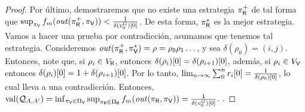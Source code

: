 \begin{proof}
Por último, demostraremos que no existe una estrategia $\pi^+_\Refuter$  de tal forma que $\sup_{\pi_\Verifier} \FMask(\out(\pi^+_\Refuter, \pi_\Verifier)) < \frac{1}{\pr{0}{\delta(v^G_0)}}$. 
De esta forma, $\pi^*_\Refuter$ es la mejor estrategia. 
Vamos a hacer una prueba por contradicción, asumamos que tenemos tal estrategia. Consideremos $\out(\pi^+_\Refuter, \pi^*_\Verifier) = \rho = \rho_0 \rho_1 \dots$, 
y sea $\delta(\rho_0) = (i,j)$. Entonces, note que, si $\rho_i \in V_\Refuter$, entonces $\pr{0}{\delta(\rho_i)} = \pr{0}{\delta(\rho_{i+1})}$, 
además, si $\rho_i \in V_\Verifier$ entonces $\pr{0}{\delta(\rho_i)} = 1 + \pr{0}{\delta(\rho_{i+1})}$. 
Por lo tanto, $\lim_{n \rightarrow \infty}\sum^n_{0} \pr{0}{r_i} = \frac{1}{\pr{0}{\delta(\rho_0)}}$, lo cual lleva a una contradicción.
Entonces, $\val(\QMStrGame) = \inf_{\pi_\Verifier \in \Pi_\Verifier} \sup_{\pi_\Refuter \in \Pi_\Refuter} \FMask(\out(\pi_\Refuter, \pi_\Verifier)) = \frac{1}{\pr{0}{\delta(v^G_0)}}$.
\qedhere
.

\end{proof} \\
\fi

